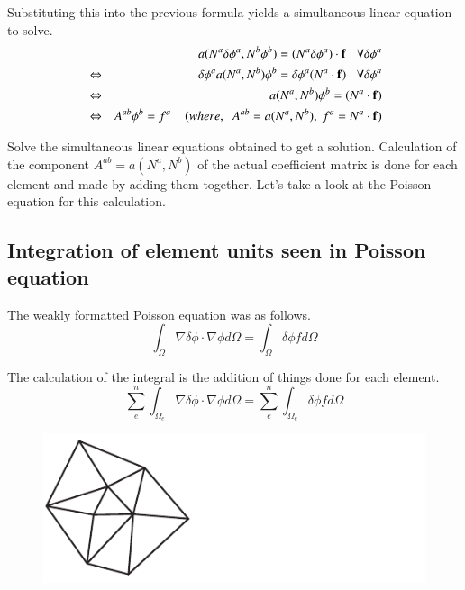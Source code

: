 Substituting this into the previous formula yields a simultaneous linear equation to solve.
%
\begin{eqnarray}
&& a(N^a\delta\phi^a,N^b\phi^b)=(N^a\delta\phi^a)\cdot\mathbf{f}\;\;\;\forall \delta\phi^a\\
&\Leftrightarrow& \delta\phi^a a(N^a,N^b)\phi^b = \delta\phi^a(N^a\cdot\mathbf{f})\;\;\;\forall \delta\phi^a\\
&\Leftrightarrow& a(N^a,N^b)\phi^b = (N^a\cdot\mathbf{f})\\
&\Leftrightarrow& A^{ab}\phi^b = f^a\;\;\;\;(where,\;\;A^{ab}=a(N^a,N^b),\;f^a=N^a\cdot\mathbf{f})
\end{eqnarray}

Solve the simultaneous linear equations obtained to get a solution.
Calculation of the component $A^{ab}=a(N^a,N^b)$ of the actual coefficient matrix is ​​done for each element and made by adding them together.
Let's take a look at the Poisson equation for this calculation.


\subsection{Integration of element units seen in Poisson equation}
The weakly formatted Poisson equation was as follows.
%
\begin{equation}
\int_{\Omega} \nabla\delta\phi\cdot\nabla\phi d\Omega = \int_{\Omega}\delta\phi f d\Omega
\end{equation}

The calculation of the integral is the addition of things done for each element.
%
\begin{equation}
\sum_e^n\int_{\Omega_e} \nabla\delta\phi\cdot\nabla\phi d\Omega = \sum_e^n\int_{\Omega_e}\delta\phi f d\Omega
\end{equation}

\begin{figure}[htbp!]
\center
\includegraphics[width=120mm]{images/variational_integration.pdf}
\label{fig:variational_integration}
\end{figure}


